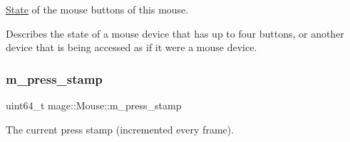\hyperlink{classmage_1_1_state}{State} of the mouse buttons of this mouse.

Describes the state of a mouse device that has up to four buttons, or another device that is being accessed as if it were a mouse device. \hypertarget{classmage_1_1_mouse_a32b30d3c37a2082869f4ff4f522dfbf8}{}\label{classmage_1_1_mouse_a32b30d3c37a2082869f4ff4f522dfbf8} 
\subsubsection{\texorpdfstring{m\+\_\+press\+\_\+stamp}{m\_press\_stamp}}
{\footnotesize\ttfamily uint64\+\_\+t mage\+::\+Mouse\+::m\+\_\+press\+\_\+stamp\hspace{0.3cm}{\ttfamily [protected]}}

The current press stamp (incremented every frame). 